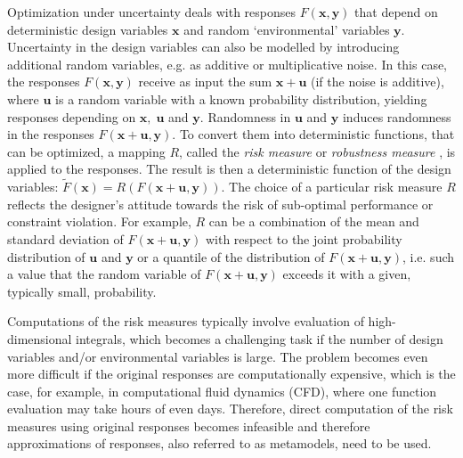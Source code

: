 \documentclass{llncs}
\begin{document}
Optimization under uncertainty deals with responses $F(\pmb x,\pmb y)$ that depend on deterministic design variables $\pmb x$ and random ‘environmental’ variables $\pmb y$. Uncertainty in the design variables can also be modelled by introducing additional random variables, e.g. as additive or multiplicative noise. In this case, the responses $F(\pmb x,\pmb y)$ receive as input the sum $\pmb x+\pmb u$ (if the noise is additive), where $\pmb u$ is a random variable with a known probability distribution, yielding responses depending on $\pmb x,\; \pmb u$ and $\pmb y$. Randomness in $\pmb u$ and $\pmb y$ induces randomness in the responses $F(\pmb x+\pmb u,\pmb y)$. To convert them into deterministic functions, that can be optimized, a mapping $R$, called the \textit{risk measure} \cite{RockafellarUryasev2000} or \textit{robustness measure} \cite{SchillingsSchulz2015}, is applied to the responses. The result is then a deterministic function of the design variables: $\widetilde{F}(\pmb x)=R(F(\pmb x+\pmb u, \pmb y))$. The choice of a particular risk measure $R$ reflects the designer's attitude towards the risk of sub-optimal performance or constraint violation. For example, $R$ can be a combination of the mean and standard deviation of $F(\pmb x+ \pmb u,\pmb y)$ with respect to the joint probability distribution of $\pmb u$ and $\pmb y$ or a quantile of the distribution of $F(\pmb x+ \pmb u,\pmb y)$, i.e. such a value that the random variable of $F(\pmb x+\pmb u,\pmb y)$ exceeds it with a given, typically small, probability.

Computations of the risk measures typically involve evaluation of high-dimensional integrals, which becomes a challenging task if the number of design variables and/or environmental variables is large. The problem becomes even more difficult if the original responses are computationally expensive, which is the case, for example, in computational fluid dynamics (CFD), where one function evaluation may take hours of even days. Therefore, direct computation of the risk measures using original responses becomes infeasible and therefore approximations of responses, also referred to as metamodels, need to be used.
\end{document}
